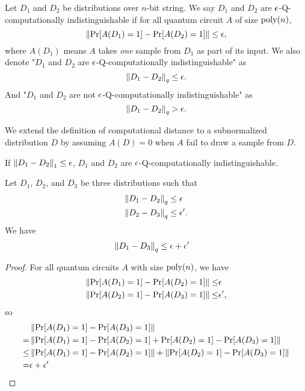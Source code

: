 
\begin{definition}\label{def:comp-indis}
Let  $D_1$ and $D_2$ be distributions over $n$-bit string.  We say $D_1$ and $D_2$  are $\epsilon$-Q-computationally indistinguishable if for all quantum circuit $A$ of size $\operatorname*{\operatorname{poly}}(n)$, $$\left\|\Pr[A({D_1})=1]-\Pr[A({D_2})=1]  \right\| \leq \epsilon,$$  where $A(D_1)$ means $A$ takes \emph{one} sample from $D_1$ as part of its input. We also denote "$D_1$ and $D_2$  are $\epsilon$-Q-computationally indistinguishable" as 
$$ \left\lVert D_1 - D_2\right\rVert_q \leq \epsilon.$$
And "$D_1$ and $D_2$  are not $\epsilon$-Q-computationally indistinguishable" as 
$$ \left\lVert D_1 - D_2\right\rVert_q > \epsilon.$$
\end{definition}

\begin{rmk}
We extend the definition of computational distance to a subnormalized distribution  $D$  by assuming $A(D)=0$ when $A$ fail to draw a sample from $D$.
\end{rmk}

\begin{rmk}\label{rmk:trace-to-comp}
If $\left\lVert D_1-D_2\right\rVert_1\leq \epsilon$, $D_1$ and $D_2$ are $\epsilon$-Q-computationally indistinguishable.
\end{rmk}

\begin{lem} \label{lem:computational-triangle0}
    Let $D_1$, $D_2$, and $D_3$ be three distributions such that 
    \begin{align}
        \left\lVert D_1 -D_2\right\rVert_q &\leq \epsilon \\ 
        \left\lVert D_2 -D_3\right\rVert_q &\leq \epsilon'. 
    \end{align}
    We have 
    \begin{align}
        \left\lVert D_1 -D_3\right\rVert_q &\leq \epsilon+\epsilon'
    \end{align}
\end{lem}
\begin{proof}
For all quantum circuits $A$ with size $\operatorname*{\operatorname{poly}}(n)$, we have 
\begin{align}
    \left\lVert\Pr[A({D_1})=1]-\Pr[A({D_2})=1]\right\rVert \leq& \epsilon \\
    \left\lVert\Pr[A({D_2})=1]-\Pr[A({D_3})=1]\right\rVert \leq& \epsilon',  
\end{align}
so 
\begin{align}
    &\left\lVert\Pr[A({D_1})=1]-\Pr[A({D_3})=1]\right\rVert \nonumber \\
    =& \left\lVert\Pr[A({D_1})=1]-\Pr[A({D_2})=1]+\Pr[A({D_2})=1]-\Pr[A({D_3})=1]\right\rVert \nonumber \\
    \leq&  \left\lVert\Pr[A({D_1})=1]-\Pr[A({D_2})=1]\right\rVert +\left\lVert\Pr[A({D_2})=1]-\Pr[A({D_3})=1]\right\rVert \nonumber \\
    =& \epsilon +\epsilon' \nonumber
\end{align}

\end{proof}



